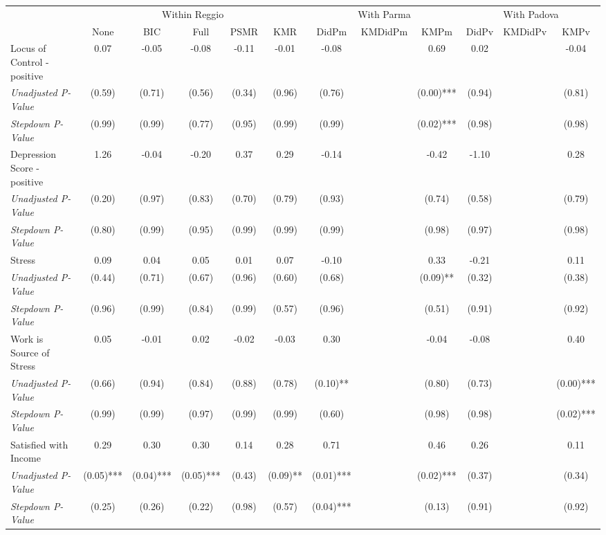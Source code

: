 \begin{tabular}{l c c c c c c c c c c c}
\toprule
& \multicolumn{5}{c}{Within Reggio} & \multicolumn{3}{c}{With Parma} & \multicolumn{3}{c}{With Padova} \\\cmidrule(lr){2-6} \cmidrule(lr){7-9} \cmidrule(lr){10-12}
 & None & BIC & Full & PSMR & KMR & DidPm & KMDidPm & KMPm & DidPv & KMDidPv & KMPv \\
\midrule
Locus of Control - positive & 0.07 & -0.05 & -0.08 & -0.11 & -0.01 & -0.08 & & 0.69 & 0.02 & & -0.04 \\
\quad \textit{Unadjusted P-Value} & (0.59) & (0.71) & (0.56) & (0.34) & (0.96) & (0.76) & & (0.00)*** & (0.94) & & (0.81) \\
\quad \textit{Stepdown P-Value} & (0.99) & (0.99) & (0.77) & (0.95) & (0.99) & (0.99) & & (0.02)*** & (0.98) & & (0.98) \\
Depression Score - positive & 1.26 & -0.04 & -0.20 & 0.37 & 0.29 & -0.14 & & -0.42 & -1.10 & & 0.28 \\
\quad \textit{Unadjusted P-Value} & (0.20) & (0.97) & (0.83) & (0.70) & (0.79) & (0.93) & & (0.74) & (0.58) & & (0.79) \\
\quad \textit{Stepdown P-Value} & (0.80) & (0.99) & (0.95) & (0.99) & (0.99) & (0.99) & & (0.98) & (0.97) & & (0.98) \\
Stress & 0.09 & 0.04 & 0.05 & 0.01 & 0.07 & -0.10 & & 0.33 & -0.21 & & 0.11 \\
\quad \textit{Unadjusted P-Value} & (0.44) & (0.71) & (0.67) & (0.96) & (0.60) & (0.68) & & (0.09)** & (0.32) & & (0.38) \\
\quad \textit{Stepdown P-Value} & (0.96) & (0.99) & (0.84) & (0.99) & (0.57) & (0.96) & & (0.51) & (0.91) & & (0.92) \\
Work is Source of Stress & 0.05 & -0.01 & 0.02 & -0.02 & -0.03 & 0.30 & & -0.04 & -0.08 & & 0.40 \\
\quad \textit{Unadjusted P-Value} & (0.66) & (0.94) & (0.84) & (0.88) & (0.78) & (0.10)** & & (0.80) & (0.73) & & (0.00)*** \\
\quad \textit{Stepdown P-Value} & (0.99) & (0.99) & (0.97) & (0.99) & (0.99) & (0.60) & & (0.98) & (0.98) & & (0.02)*** \\
Satisfied with Income & 0.29 & 0.30 & 0.30 & 0.14 & 0.28 & 0.71 & & 0.46 & 0.26 & & 0.11 \\
\quad \textit{Unadjusted P-Value} & (0.05)*** & (0.04)*** & (0.05)*** & (0.43) & (0.09)** & (0.01)*** & & (0.02)*** & (0.37) & & (0.34) \\
\quad \textit{Stepdown P-Value} & (0.25) & (0.26) & (0.22) & (0.98) & (0.57) & (0.04)*** & & (0.13) & (0.91) & & (0.92) \\

\end{tabular}

